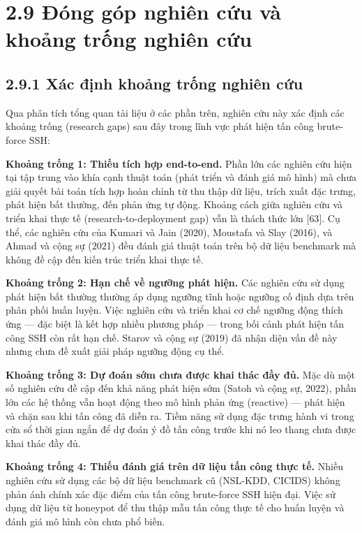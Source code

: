 \documentclass[
  a4paper]{report}
\begin{document}
\section{2.9 Đóng góp nghiên cứu và khoảng trống nghiên
cứu}\label{ux111uxf3ng-guxf3p-nghiuxean-cux1ee9u-vuxe0-khoux1ea3ng-trux1ed1ng-nghiuxean-cux1ee9u}

\subsection{2.9.1 Xác định khoảng trống nghiên
cứu}\label{xuxe1c-ux111ux1ecbnh-khoux1ea3ng-trux1ed1ng-nghiuxean-cux1ee9u}

Qua phân tích tổng quan tài liệu ở các phần trên, nghiên cứu này xác
định các khoảng trống (research gaps) sau đây trong lĩnh vực phát hiện
tấn công brute-force SSH:

\textbf{Khoảng trống 1: Thiếu tích hợp end-to-end.} Phần lớn các nghiên
cứu hiện tại tập trung vào khía cạnh thuật toán (phát triển và đánh giá
mô hình) mà chưa giải quyết bài toán tích hợp hoàn chỉnh từ thu thập dữ
liệu, trích xuất đặc trưng, phát hiện bất thường, đến phản ứng tự động.
Khoảng cách giữa nghiên cứu và triển khai thực tế
(research-to-deployment gap) vẫn là thách thức lớn {[}63{]}. Cụ thể, các
nghiên cứu của Kumari và Jain (2020), Moustafa và Slay (2016), và Ahmad
và cộng sự (2021) đều đánh giá thuật toán trên bộ dữ liệu benchmark mà
không đề cập đến kiến trúc triển khai thực tế.

\textbf{Khoảng trống 2: Hạn chế về ngưỡng phát hiện.} Các nghiên cứu sử
dụng phát hiện bất thường thường áp dụng ngưỡng tĩnh hoặc ngưỡng cố định
dựa trên phân phối huấn luyện. Việc nghiên cứu và triển khai cơ chế
ngưỡng động thích ứng --- đặc biệt là kết hợp nhiều phương pháp ---
trong bối cảnh phát hiện tấn công SSH còn rất hạn chế. Starov và cộng sự
(2019) đã nhận diện vấn đề này nhưng chưa đề xuất giải pháp ngưỡng động
cụ thể.

\textbf{Khoảng trống 3: Dự đoán sớm chưa được khai thác đầy đủ.} Mặc dù
một số nghiên cứu đề cập đến khả năng phát hiện sớm (Satoh và cộng sự,
2022), phần lớn các hệ thống vẫn hoạt động theo mô hình phản ứng
(reactive) --- phát hiện và chặn sau khi tấn công đã diễn ra. Tiềm năng
sử dụng đặc trưng hành vi trong cửa sổ thời gian ngắn để dự đoán ý đồ
tấn công trước khi nó leo thang chưa được khai thác đầy đủ.

\textbf{Khoảng trống 4: Thiếu đánh giá trên dữ liệu tấn công thực tế.}
Nhiều nghiên cứu sử dụng các bộ dữ liệu benchmark cũ (NSL-KDD, CICIDS)
không phản ánh chính xác đặc điểm của tấn công brute-force SSH hiện đại.
Việc sử dụng dữ liệu từ honeypot để thu thập mẫu tấn công thực tế cho
huấn luyện và đánh giá mô hình còn chưa phổ biến.
\end{document}
